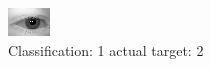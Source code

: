 \begin{figure}[h!]
\begin{center}
\includegraphics[width=0.60\columnwidth]{figures/ID340_class_1_target_2.png}
\end{center}
\caption{ Classification: 1 actual target: 2}
\label{fig:ID340_class_1_target_2}
\end{figure}
